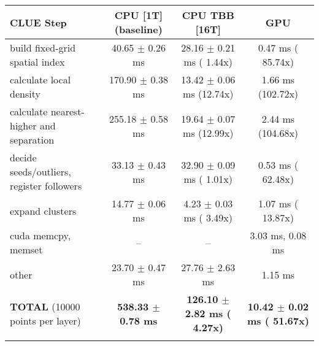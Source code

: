     \begin{tabular}{l|c|c|c}
    \hline
    CLUE Step                                 & CPU [1T] (baseline)         & CPU TBB [16T]                         & GPU                       \\ \hline
    build fixed-grid spatial index            &  40.65 $\pm$  0.26 ms       &  28.16 $\pm$  0.21 ms ( 1.44x)        &   0.47 ms ( 85.74x)       \\
    calculate local density                   & 170.90 $\pm$  0.38 ms       &  13.42 $\pm$  0.06 ms (12.74x)        &   1.66 ms (102.72x)       \\
    calculate nearest-higher and separation   & 255.18 $\pm$  0.58 ms       &  19.64 $\pm$  0.07 ms (12.99x)        &   2.44 ms (104.68x)       \\
    decide seeds/outliers, register followers &  33.13 $\pm$  0.43 ms       &  32.90 $\pm$  0.09 ms ( 1.01x)        &   0.53 ms ( 62.48x)       \\
    expand clusters                           &  14.77 $\pm$  0.06 ms       &   4.23 $\pm$  0.03 ms ( 3.49x)        &   1.07 ms ( 13.87x)       \\ \hline
    cuda memcpy, memset                       & --                          & --                                    &   3.03 ms,   0.08 ms      \\ 
    other                                     &  23.70 $\pm$  0.47 ms       &  27.76 $\pm$  2.63 ms                 &   1.15 ms                 \\ \hline
    \textbf{TOTAL} (10000 points per layer)   & \textbf{538.33 $\pm$  0.78 ms} & \textbf{126.10 $\pm$  2.82 ms ( 4.27x)} & \textbf{ 10.42 $\pm$  0.02 ms ( 51.67x)}  \\
    \hline
    \multicolumn{4}{c}{} 
    \end{tabular}
    \linebreak


